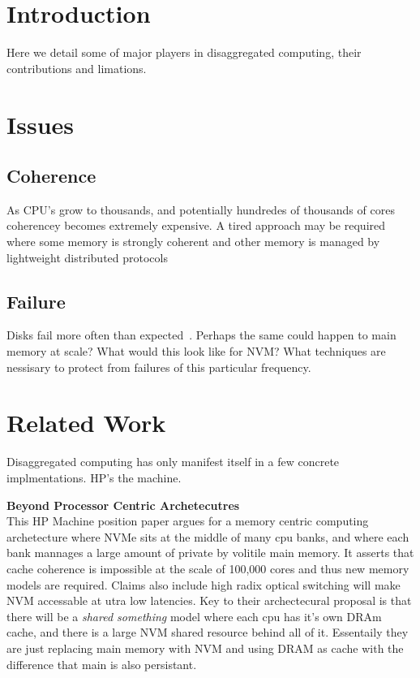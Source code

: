 \section{Introduction}
\label{sec:intro}

Here we detail some of major players in disaggregated computing, their contributions and limations.

\section{Issues}

\subsection{Coherence}

As CPU's grow to thousands, and potentially hundredes of thousands of cores coherencey becomes extremely expensive. A tired approach may be required where some memory is strongly coherent and other memory is managed by lightweight distributed protocols~\cite{189914}

\subsection{Failure}

Disks fail more often than expected~\cite{Schroeder:2007:DFR:1267903.1267904}.
Perhaps the same could happen to main memory at scale? What would this look
like for NVM? What techniques are nessisary to protect from failures of this
particular frequency.

\section{Related Work}
Disaggregated computing has only manifest itself in a few concrete
implmentations. HP's the machine. 

\textbf{Beyond Processor Centric Archetecutres}~\cite{189914} \\
This HP Machine position paper argues for a memory centric computing
archetecture where NVMe sits at the middle of many cpu banks, and where each
bank mannages a large amount of private by volitile main memory. It asserts
that cache coherence is impossible at the scale of 100,000 cores and thus new
memory models are required. Claims also include high radix optical switching
will make NVM accessable at utra low latencies. Key to their archectecural
proposal is that there will be a \textit{shared something} model where each cpu
has it's own DRAm cache, and there is a large NVM shared resource behind all of
it. Essentaily they are just replacing main memory with NVM and using DRAM as
cache with the difference that main is also persistant.

